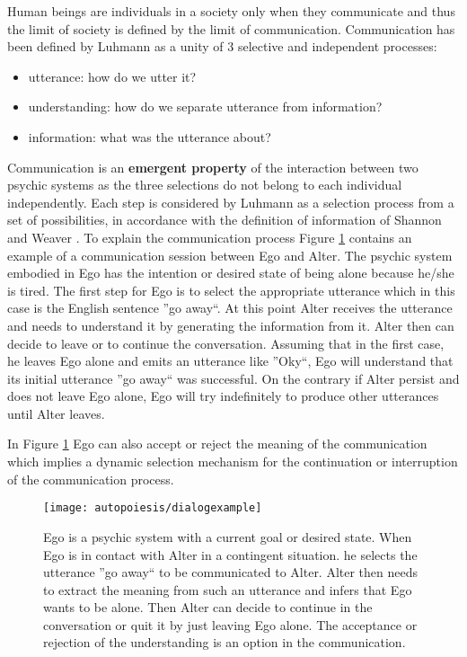 Human beings are individuals in a society only when they communicate and
thus the limit of society is defined by the limit of communication.
Communication has been defined by Luhmann as a unity of 3 selective
and independent processes:
\begin{itemize}
 \item utterance: how do we utter it?
 \item understanding: how do we separate utterance from information?
 \item information: what was the utterance about?
\end{itemize}
Communication is an \textbf{emergent property} of the interaction between two psychic systems
as the three selections do not belong to each individual independently.
Each step is considered by Luhmann as a selection process from a set of possibilities,
in accordance with the definition of information of Shannon and Weaver \citep{Shannon76}.
To explain the communication process Figure \ref{Fig:Autopoiesis:CommExample}
contains an example of a communication session between Ego and Alter.
The psychic system embodied in Ego has the intention or desired state of being alone
 because he/she is tired.
The first step for Ego is to select the appropriate utterance which in this case 
is the English sentence ''go away``.
At this point Alter receives the utterance and needs to understand it by generating the 
information from it.
Alter then can decide to leave or to continue the conversation. Assuming that in the first
case, he leaves Ego alone and emits an utterance like ''Oky``, Ego will understand that 
its initial utterance ''go away`` was successful.
On the contrary if Alter persist and does not leave Ego alone, Ego will try
 indefinitely to produce other utterances until Alter leaves.
 
In Figure \ref{Fig:Autopoiesis:CommExample} Ego can also accept or reject the
meaning of the communication which implies a dynamic selection mechanism for
the continuation or interruption of the communication process.

\begin{figure}[htbp]
\begin{center}
\texttt{[image: autopoiesis/dialogexample]}
\end{center}
\small{
\caption[Communication between alter and ego]{
Ego is a psychic system with a current goal or desired state.
When Ego is in contact with Alter in a contingent situation. he selects the utterance 
''go away`` to be communicated to Alter. Alter then needs to extract the 
meaning from such an utterance and infers that Ego wants to be alone. 
Then Alter can decide to continue in the conversation or quit it by just leaving
 Ego alone.
The acceptance or rejection of the understanding is an option in the communication.
\label{Fig:Autopoiesis:CommExample}}}
\end{figure}

